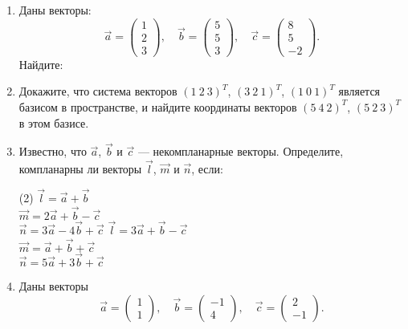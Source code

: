 \begin{enumerate}%
    \item Даны векторы:
    \[
    \vec a =
    \begin{pmatrix}
    	1 \\ 2 \\ 3
    \end{pmatrix},
    \quad
    \vec b =
    \begin{pmatrix}
    	5 \\ 5 \\ 3
    \end{pmatrix},
    \quad
    \vec c = 
	\begin{pmatrix}
    	8 \\ 5 \\ -2
    \end{pmatrix}.
   \]
   Найдите:
   \begin{center}
   \end{center}
   
   \item Докажите, что система векторов
	    $(1\ 2\ 3)^T$,
	    $(3\ 2\ 1)^T$,
	    $(1\ 0\ 1)^T$
	    является базисом в пространстве, и найдите координаты векторов 
	    $(5\ 4\ 2)^T$,
	    $(5\ 2\ 3)^T$
	    в этом базисе.
	    
	\item Известно, что $\vec a$, $\vec b$ и $\vec c$ --- некомпланарные векторы. Определите, компланарны ли векторы $\vec l$, $\vec m$ и $\vec n$, если:
		\begin{tasks}(2)
	       \task $\vec l = \vec a + \vec b$\\
	      	 	 $\vec m = 2 \vec a + \vec b - \vec c$\\
	      	 	 $\vec n = 3 \vec a -4 \vec b + \vec c$
	       \task $\vec l = 3 \vec a + \vec b - \vec c$\\
	      	 	 $\vec m =  \vec a + \vec b + \vec c$\\
	      	 	 $\vec n = 5 \vec a +3 \vec b + \vec c$
	    \end{tasks}
	    
	\item Даны векторы
	$$\vec a = \begin{pmatrix}
	    	1 \\ 1
	    \end{pmatrix},\quad
	   \vec b = \begin{pmatrix}
	    	-1 \\ 4
	    \end{pmatrix},\quad
	    \vec c = \begin{pmatrix}
	    	2 \\ -1
	    \end{pmatrix}.$$
	  

\end{enumerate}
